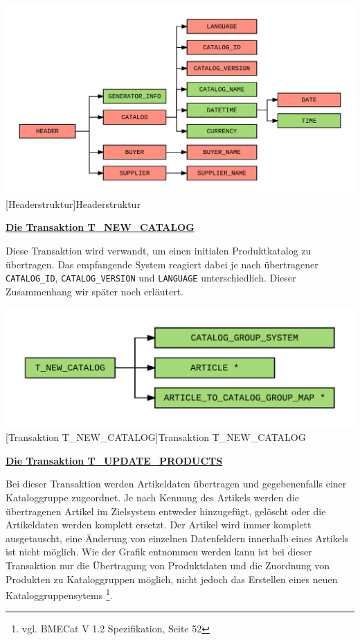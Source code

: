 	\begin{minipage}{\linewidth}
		\vspace{1em}
		\centering
		\includegraphics[width=0.85\linewidth]{img/BMECat_Header}
		[Headerstruktur]{Headerstruktur}
		\label{fig:header}
		\vspace{1em}
	\end{minipage}
	
	
	
	\textbf{\underline{Die Transaktion T\_NEW\_CATALOG}}
	
	Diese Transaktion wird verwandt, um einen initialen Produktkatalog zu übertragen. Das empfangende System reagiert dabei je nach übertragener \texttt{CATALOG\_ID}, \texttt{CATALOG\_VERSION}
	und \texttt{LANGUAGE} unterschiedlich. Dieser Zusammenhang wir später noch erläutert. %
	
	
	\begin{minipage}{\linewidth}
		\vspace{1em}
		\centering
		\includegraphics[width=0.65\linewidth]{img/newCatalog}
		[Transaktion T\_NEW\_CATALOG]{Transaktion T\_NEW\_CATALOG}
		\label{fig:header}
		\vspace{1em}
	\end{minipage}
	
	\textbf{\underline{Die Transaktion T\_UPDATE\_PRODUCTS}}
	
	Bei dieser Transaktion werden Artikeldaten übertragen und gegebenenfalls einer Kataloggruppe zugeordnet. Je nach Kennung des Artikels werden die übertragenen
	Artikel im Zielsystem entweder hinzugefügt, gelöscht oder die Artikeldaten werden komplett ersetzt.
	Der Artikel wird immer komplett ausgetauscht, eine Änderung von einzelnen Datenfeldern innerhalb eines Artikels ist nicht möglich.
	Wie der Grafik entnommen werden kann ist bei dieser Transaktion nur die Übertragung von Produktdaten und die Zuordnung von Produkten zu Kataloggruppen möglich, nicht jedoch das Erstellen eines neuen Kataloggruppensytems \footnote{vgl. BMECat V 1.2 Spezifikation, Seite 52}.
	
